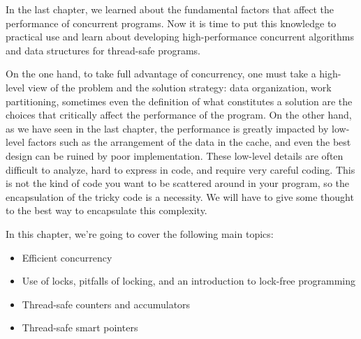In the last chapter, we learned about the fundamental factors that affect the performance of concurrent programs. Now it is time to put this knowledge to practical use and learn about developing high-performance concurrent algorithms and data structures for thread-safe programs.

On the one hand, to take full advantage of concurrency, one must take a high-level view of the problem and the solution strategy: data organization, work partitioning, sometimes even the definition of what constitutes a solution are the choices that critically affect the performance of the program. On the other hand, as we have seen in the last chapter, the performance is greatly impacted by low-level factors such as the arrangement of the data in the cache, and even the best design can be ruined by poor implementation. These low-level details are often difficult to analyze, hard to express in code, and require very careful coding. This is not the kind of code you want to be scattered around in your program, so the encapsulation of the tricky code is a necessity. We will have to give some thought to the best way to encapsulate this complexity.

In this chapter, we're going to cover the following main topics:

\begin{itemize}
\item Efficient concurrency
\item Use of locks, pitfalls of locking, and an introduction to lock-free programming
\item Thread-safe counters and accumulators
\item Thread-safe smart pointers
\end{itemize}





